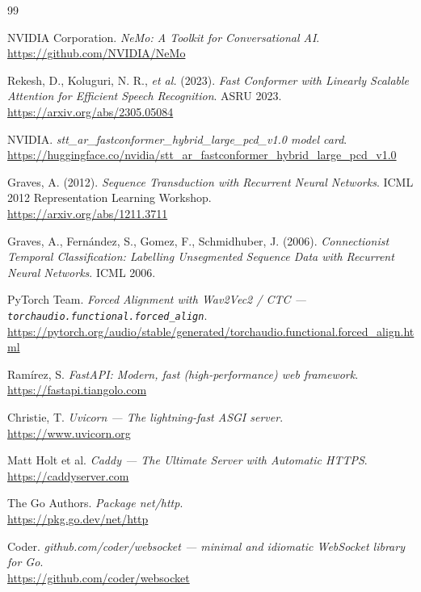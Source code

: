\begin{thebibliography}{99}

NVIDIA Corporation. \emph{NeMo: A Toolkit for Conversational AI}. \\
\url{https://github.com/NVIDIA/NeMo}

Rekesh, D., Koluguri, N. R., \emph{et al.} (2023). \emph{Fast Conformer with Linearly Scalable Attention for Efficient Speech Recognition}. ASRU 2023. \\
\url{https://arxiv.org/abs/2305.05084}

NVIDIA. \emph{stt\_ar\_fastconformer\_hybrid\_large\_pcd\_v1.0 model card}. \\
\url{https://huggingface.co/nvidia/stt_ar_fastconformer_hybrid_large_pcd_v1.0}

Graves, A. (2012). \emph{Sequence Transduction with Recurrent Neural Networks}. ICML 2012 Representation Learning Workshop. \\
\url{https://arxiv.org/abs/1211.3711}

Graves, A., Fern\'andez, S., Gomez, F., Schmidhuber, J. (2006). \emph{Connectionist Temporal Classification: Labelling Unsegmented Sequence Data with Recurrent Neural Networks}. ICML 2006.

PyTorch Team. \emph{Forced Alignment with Wav2Vec2 / CTC --- \texttt{torchaudio.functional.forced\_align}}. \\
\url{https://pytorch.org/audio/stable/generated/torchaudio.functional.forced_align.html}

Ram\'irez, S. \emph{FastAPI: Modern, fast (high-performance) web framework}. \\
\url{https://fastapi.tiangolo.com}

Christie, T. \emph{Uvicorn --- The lightning-fast ASGI server}. \\
\url{https://www.uvicorn.org}

Matt Holt et al. \emph{Caddy --- The Ultimate Server with Automatic HTTPS}. \\
\url{https://caddyserver.com}

The Go Authors. \emph{Package net/http}. \\
\url{https://pkg.go.dev/net/http}

Coder. \emph{github.com/coder/websocket --- minimal and idiomatic WebSocket library for Go}. \\
\url{https://github.com/coder/websocket}


\end{thebibliography}
